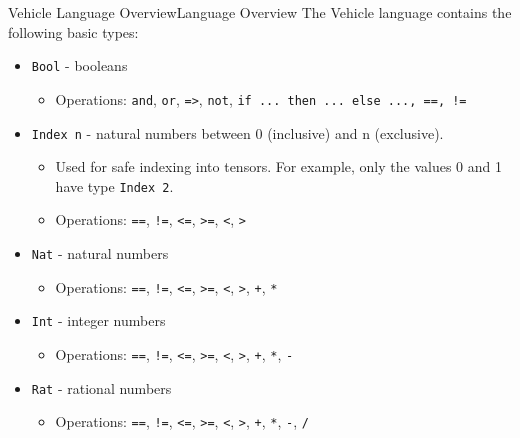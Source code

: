 \documentclass[t,compress,aspectratio=169]{beamer}
\newcommand{\vehicle}[1]{{\texttt{#1}}}
\begin{document}
\begin{frame}{Vehicle Language Overview}{Language Overview}
The Vehicle language contains the following basic types:
\begin{itemize}
\item \vehicle{Bool} - booleans
\begin{itemize}
\item Operations: \vehicle{and}, \vehicle{or}, \vehicle{=>}, \vehicle{not}, \vehicle{if ... then ... else ..., ==, !=}
\end{itemize}
\item \vehicle{Index n} - natural numbers between 0 (inclusive) and n (exclusive).
\begin{itemize}
\item Used for safe indexing into tensors. For example, only the values 0 and 1 have type \vehicle{Index 2}.
\item Operations: \vehicle{==}, \vehicle{!=}, \vehicle{<=}, \vehicle{>=}, \vehicle{<}, \vehicle{>}
\end{itemize}
\item \vehicle{Nat} - natural numbers
\begin{itemize}
\item Operations: \vehicle{==}, \vehicle{!=}, \vehicle{<=}, \vehicle{>=}, \vehicle{<}, \vehicle{>}, \vehicle{+}, \vehicle{*}
\end{itemize}
\item \vehicle{Int} - integer numbers
\begin{itemize}
\item Operations: \vehicle{==}, \vehicle{!=}, \vehicle{<=}, \vehicle{>=}, \vehicle{<}, \vehicle{>}, \vehicle{+}, \vehicle{*}, \vehicle{-}
\end{itemize}
\item \vehicle{Rat} - rational numbers
\begin{itemize}
\item Operations: \vehicle{==}, \vehicle{!=}, \vehicle{<=}, \vehicle{>=}, \vehicle{<}, \vehicle{>}, \vehicle{+}, \vehicle{*}, \vehicle{-}, \vehicle{/}
\end{itemize}
\end{itemize}

\end{frame}
\end{document}
